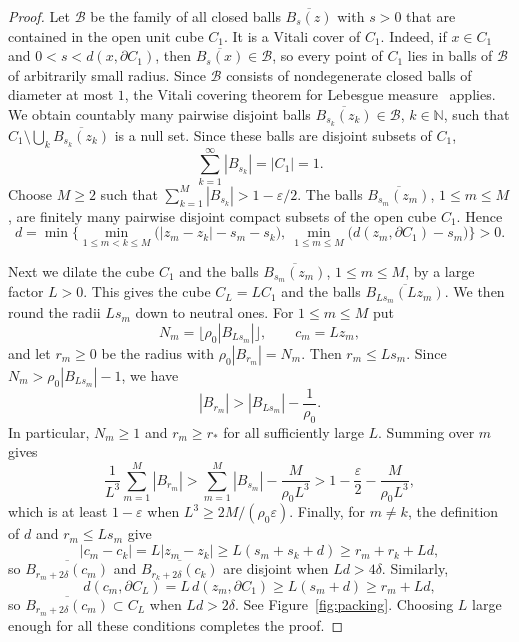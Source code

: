 \documentclass[final,reqno]{amsart}
\theoremstyle{remark}
\theoremstyle{definition}
\renewcommand{\le}{\leqslant}
\renewcommand{\ge}{\geqslant}
\newcommand{\NN}{\mathbb{N}}
\newcommand{\BC}{\mathcal{B}}
\begin{document}
\begin{proof}
Let $\BC$ be the family of all closed balls $\overline{B_s(z)}$ with $s>0$ that are contained in the open unit cube $C_1$. It is a Vitali cover of $C_1$. Indeed, if $x\in C_1$ and $0<s<d(x,\partial C_1)$, then $\overline{B_s(x)}\in\BC$, so every point of $C_1$ lies in balls of $\BC$ of arbitrarily small radius. Since $\BC$ consists of nondegenerate closed balls of diameter at most $1$, the Vitali covering theorem for Lebesgue measure~\cite[Sec.~1.5]{evans2015measure} applies. We obtain countably many pairwise disjoint balls $\overline{B_{s_k}(z_k)}\in\BC$, $k\in\NN$, such that $C_1\setminus\bigcup_k\overline{B_{s_k}(z_k)}$ is a null set. Since these balls are disjoint subsets of $C_1$,
\[
\sum_{k=1}^\infty|B_{s_k}|=|C_1|=1.
\]
Choose $M\ge2$ such that $\sum_{k=1}^M|B_{s_k}|>1-\varepsilon/2$. The balls $\overline{B_{s_m}(z_m)}$, $1\le m\le M$, are finitely many pairwise disjoint compact subsets of the open cube $C_1$. Hence
\[
d=\min\Big\{\min_{1\le m<k\le M}\big(|z_m-z_k|-s_m-s_k\big),\ \min_{1\le m\le M}\big(d(z_m,\partial C_1)-s_m\big)\Big\}>0.
\]

Next we dilate the cube $C_1$ and the balls $\overline{B_{s_m}(z_m)}$, $1\le m\le M$, by a large factor $L>0$. This gives the cube $C_L=LC_1$ and the balls $\overline{B_{Ls_m}(Lz_m)}$.
 We then round the radii $Ls_m$ down to neutral ones. For $1\le m\le M$ put
\[
N_m=\big\lfloor\rho_0|B_{Ls_m}|\big\rfloor,
\qquad
c_m=Lz_m,
\]
and let $r_m\ge0$ be the radius with $\rho_0|B_{r_m}|=N_m$. Then $r_m\le Ls_m$. Since $N_m>\rho_0|B_{Ls_m}|-1$, we have
\[
|B_{r_m}|>|B_{Ls_m}|-\frac1{\rho_0}.
\]
In particular, $N_m\ge1$ and $r_m\ge r_*$ for all sufficiently large $L$. Summing over $m$ gives
\[
\frac1{L^3}\sum_{m=1}^M|B_{r_m}|
>\sum_{m=1}^M|B_{s_m}|-\frac{M}{\rho_0L^3}
>1-\frac\varepsilon2-\frac{M}{\rho_0L^3},
\]
which is at least $1-\varepsilon$ when $L^3\ge2M/(\rho_0\varepsilon)$. Finally, for $m\ne k$, the definition of $d$ and $r_m\le Ls_m$ give
\[
|c_m-c_k|=L|z_m-z_k|\ge L(s_m+s_k+d)\ge r_m+r_k+Ld,
\]
so $\overline{B_{r_m+2\delta}(c_m)}$ and $\overline{B_{r_k+2\delta}(c_k)}$ are disjoint when $Ld>4\delta$. Similarly,
\[
d(c_m,\partial C_L)=L\,d(z_m,\partial C_1)\ge L(s_m+d)\ge r_m+Ld,
\]
so $\overline{B_{r_m+2\delta}(c_m)}\subset C_L$ when $Ld>2\delta$. See Figure~\ref{fig:packing}. Choosing $L$ large enough for all these conditions completes the proof.
\end{proof}
\end{document}
